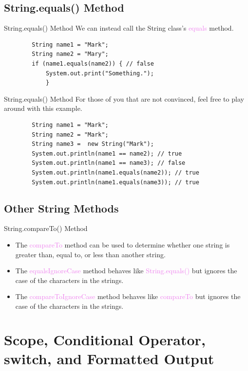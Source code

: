 \documentclass[11pt]{beamer}
\newcommand{\violet}[1]{\textcolor{violet}{#1}}
\begin{document}
\subsection{String.equals() Method}
\begin{frame}[fragile]{String.equals() Method}
    We can instead call the String class's \violet{equals} method.
        \begin{lstlisting}
        String name1 = "Mark";
        String name2 = "Mary";
        if (name1.equals(name2)) { // false
            System.out.print("Something.");
            }
    \end{lstlisting}
\end{frame}

\begin{frame}[fragile]{String.equals() Method}
    For those of you that are not convinced, feel free to play around with this example.
        \begin{lstlisting}
        String name1 = "Mark";
        String name2 = "Mark";
        String name3 =  new String("Mark"); 
        System.out.println(name1 == name2); // true
        System.out.println(name1 == name3); // false
        System.out.println(name1.equals(name2)); // true
        System.out.println(name1.equals(name3)); // true
        \end{lstlisting}
\end{frame}

\subsection{Other String Methods}
\begin{frame}[fragile]{String.compareTo() Method}
    \begin{itemize}
        \item
            The \violet{compareTo} method can be used to determine whether one string is greater than, equal to, or less than another string.
        \item
            The \violet{equalsIgnoreCase} method behaves like \violet{String.equals()} but ignores the case of the characters in the strings.
        \item
            The \violet{compareToIgnoreCase} method behaves like \violet{compareTo} but ignores the case of the characters in the strings.
    \end{itemize}
\end{frame}

\section{Scope, Conditional Operator, switch, and Formatted Output}
\end{document}
